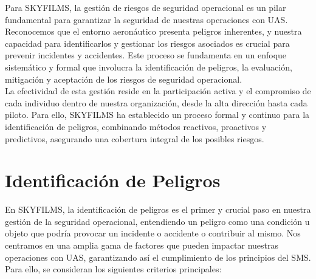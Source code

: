 Para SKYFILMS, la gestión de riesgos de seguridad operacional es un pilar fundamental para garantizar la seguridad de nuestras operaciones con UAS. Reconocemos que el entorno aeronáutico presenta peligros inherentes, y nuestra capacidad para identificarlos y gestionar los riesgos asociados es crucial para prevenir incidentes y accidentes. Este proceso se fundamenta en un enfoque sistemático y formal que involucra la identificación de peligros, la evaluación, mitigación y aceptación de los riesgos de seguridad operacional.\\

La efectividad de esta gestión reside en la participación activa y el compromiso de cada individuo dentro de nuestra organización, desde la alta dirección hasta cada piloto. Para ello, SKYFILMS ha establecido un proceso formal y continuo para la identificación de peligros, combinando métodos reactivos, proactivos y predictivos, asegurando una cobertura integral de los posibles riesgos.\\

\section{Identificación de Peligros}
En SKYFILMS, la identificación de peligros es el primer y crucial paso en nuestra gestión de la seguridad operacional, entendiendo un peligro como una condición u objeto que podría provocar un incidente o accidente o contribuir al mismo. Nos centramos en una amplia gama de factores que pueden impactar nuestras operaciones con UAS, garantizando así el cumplimiento de los principios del SMS. Para ello, se consideran los siguientes criterios principales:

